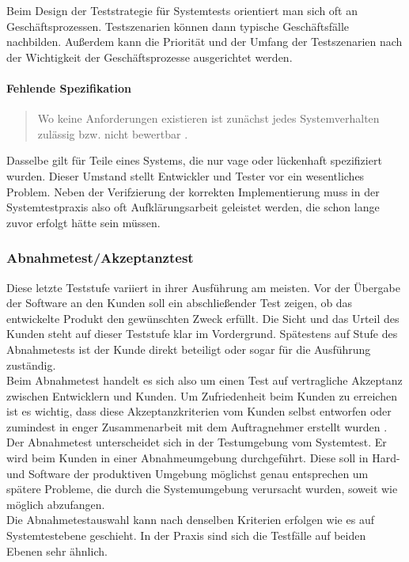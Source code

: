 Beim Design der Teststrategie für Systemtests orientiert man sich oft an Geschäftsprozessen. Testszenarien können dann typische Geschäftsfälle nachbilden. Außerdem kann die Priorität und  der Umfang der Testszenarien nach der Wichtigkeit der Geschäftsprozesse ausgerichtet werden.

\paragraph{Fehlende Spezifikation}

\begin{quote}
Wo keine Anforderungen existieren ist zunächst jedes Systemverhalten zulässig bzw. nicht bewertbar \cite{spillner_basiswissen_2012}.
\end{quote}
Dasselbe gilt für Teile eines Systems, die nur vage oder lückenhaft spezifiziert wurden. Dieser Umstand stellt Entwickler und Tester vor ein wesentliches Problem. Neben der Verifzierung der korrekten Implementierung muss in der Systemtestpraxis also oft Aufklärungsarbeit geleistet werden, die schon lange zuvor erfolgt hätte sein müssen.

\subsubsection{Abnahmetest/Akzeptanztest}
Diese letzte Teststufe variiert in ihrer Ausführung am meisten. Vor der Übergabe der Software an den Kunden soll ein abschließender Test zeigen, ob das entwickelte Produkt den gewünschten Zweck erfüllt. Die Sicht und das Urteil des Kunden steht auf dieser Teststufe klar im Vordergrund. Spätestens auf Stufe des Abnahmetests ist der Kunde direkt beteiligt oder sogar für die Ausführung zuständig.\\
Beim Abnahmetest handelt es sich also um einen Test auf vertragliche Akzeptanz zwischen Entwicklern und Kunden. Um Zufriedenheit beim Kunden zu erreichen ist es wichtig, dass diese Akzeptanzkriterien vom Kunden selbst entworfen oder zumindest in enger Zusammenarbeit mit dem Auftragnehmer erstellt wurden \cite{spillner_basiswissen_2012}. Der Abnahmetest unterscheidet sich in der Testumgebung vom Systemtest. Er wird beim Kunden in einer Abnahmeumgebung durchgeführt. Diese soll in Hard- und Software der produktiven Umgebung möglichst genau entsprechen um spätere Probleme, die durch die Systemumgebung verursacht wurden, soweit wie möglich abzufangen.\\
Die Abnahmetestauswahl kann nach denselben Kriterien erfolgen wie es auf Systemtestebene geschieht. In der Praxis sind sich die Testfälle auf beiden Ebenen sehr ähnlich.

